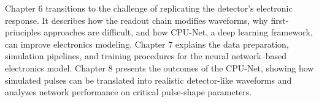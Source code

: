 Chapter 6 transitions to the challenge of replicating the detector’s electronic response. It describes how the readout chain modifies waveforms, why first-principles approaches are difficult, and how CPU-Net, a deep learning framework, can improve electronics modeling. Chapter 7 explains the data preparation, simulation pipelines, and training procedures for the neural network–based electronics model. Chapter 8 presents the outcomes of the CPU-Net, showing how simulated pulses can be translated into realistic detector-like waveforms and analyzes network performance on critical pulse-shape parameters.
